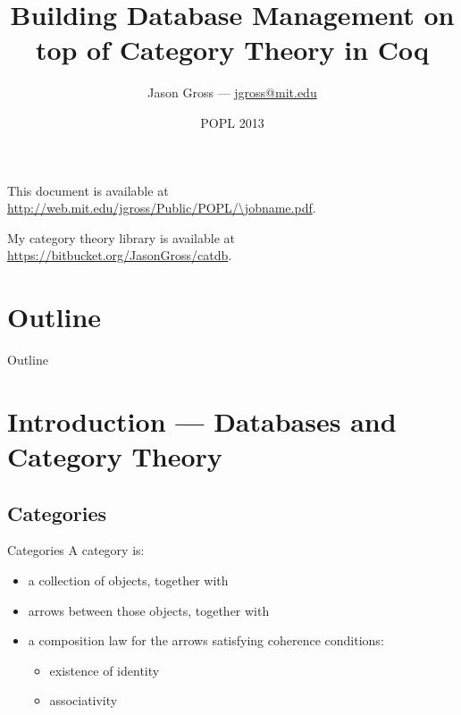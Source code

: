 \documentclass[utf8x]{beamer}
\begin{document}
\title[Database Management on top of Category Theory in Coq]{Building Database Management on top of Category Theory in Coq}
\date{POPL 2013}
\author{Jason Gross --- \href{mailto:jgross@mit.edu}{jgross@mit.edu}}

\begin{frame}
  \titlepage
  This document is available at \url{http://web.mit.edu/jgross/Public/POPL/\jobname.pdf}.

  My category theory library is available at \url{https://bitbucket.org/JasonGross/catdb}.
\end{frame}

\section*{Outline}
  \begin{frame}{Outline}
    \tableofcontents[pausesections]
  \end{frame}

\section{Introduction --- Databases and Category Theory}
  \subsection{Categories}
    \begin{frame}{Categories}
      A category is:
      \begin{itemize}
        \item
          a collection of objects, \pause together with
        \item
          arrows between those objects, \pause together with
        \item
          a composition law for the arrows satisfying coherence conditions:
          \begin{itemize}
            \item existence of identity
            \item associativity
          \end{itemize} \pause
      \end{itemize}
      \begin{center}
      \end{center}
    \end{frame}
\end{document}
